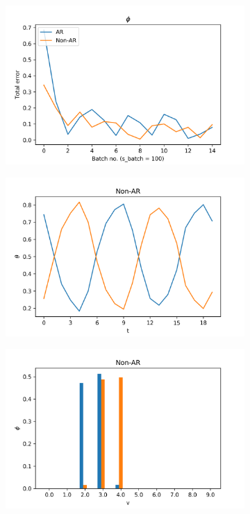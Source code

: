 \documentclass[12pt]{article}
\begin{document}
\begin{figure}[H]
\begin{subfigure}[b]{0.3\textwidth}
  \end{subfigure}%

  \begin{subfigure}[b]{0.3\textwidth}
    \includegraphics[width=\linewidth]{performance_phis_experiment-1|overlapping-yes_dataset-10.png}
  \end{subfigure}%
  \begin{subfigure}[b]{0.3\textwidth}
    \includegraphics[width=\linewidth]{latent_thetas_Non-AR_experiment-1|overlapping-yes_dataset-10.png}
  \end{subfigure}%
  \begin{subfigure}[b]{0.3\textwidth}
    \includegraphics[width=\linewidth]{latent_phis_Non-AR_experiment-1|overlapping-yes_dataset-10.png}

\end{subfigure}
\end{figure}
\end{document}
